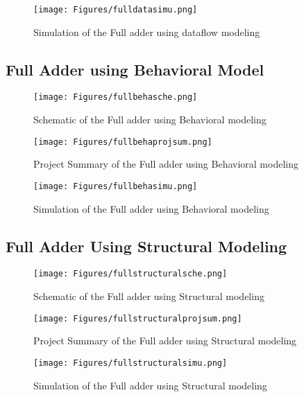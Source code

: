 \begin{figure}[H]
\centering
\texttt{[image: Figures/fulldatasimu.png]}
\caption{Simulation of the Full adder using dataflow modeling}
\label{figure:3}
\end{figure}

\subsection{Full Adder using Behavioral Model}
 \begin{figure}[H]
   \texttt{[image: Figures/fullbehasche.png]} 
\centering
\caption{Schematic of the Full adder using Behavioral modeling}
\label{figure:1}
\end{figure}
\begin{figure}[H]
\centering
\texttt{[image: Figures/fullbehaprojsum.png]}
\caption{Project Summary of the Full adder using Behavioral modeling}
\label{figure:2}
\end{figure}


\begin{figure}[H]
\centering
\texttt{[image: Figures/fullbehasimu.png]}
\caption{Simulation of the Full adder using Behavioral modeling}
\label{figure:3}
\end{figure}

\subsection{Full Adder Using Structural Modeling}
 \begin{figure}[H]
   \texttt{[image: Figures/fullstructuralsche.png]} 
\centering
\caption{Schematic of the Full adder using Structural modeling}
\label{figure:1}
\end{figure}
\begin{figure}[H]
\centering
\texttt{[image: Figures/fullstructuralprojsum.png]}
\caption{Project Summary of the Full adder using Structural modeling}
\label{figure:2}
\end{figure}


\begin{figure}[H]
\centering
\texttt{[image: Figures/fullstructuralsimu.png]}
\caption{Simulation of the Full adder using Structural modeling}
\label{figure:3}
\end{figure}



